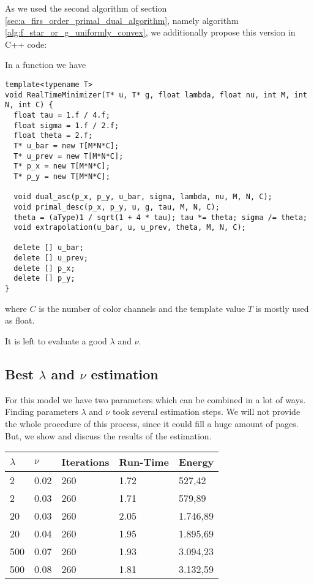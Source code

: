    As we used the second algorithm of section \ref{sec:a_firs_order_primal_dual_algorithm}, namely algorithm \ref{alg:f_star_or_g_uniformly_convex}, we additionally propose this version in C++ code:

    \begin{algorithm}
    \label{alg:primal_dual_2}
        In a function we have
        \begin{lstlisting}
template<typename T>
void RealTimeMinimizer(T* u, T* g, float lambda, float nu, int M, int N, int C) {
  float tau = 1.f / 4.f;
  float sigma = 1.f / 2.f;
  float theta = 2.f;
  T* u_bar = new T[M*N*C];
  T* u_prev = new T[M*N*C];
  T* p_x = new T[M*N*C];
  T* p_y = new T[M*N*C];
  
  void dual_asc(p_x, p_y, u_bar, sigma, lambda, nu, M, N, C);
  void primal_desc(p_x, p_y, u, g, tau, M, N, C);
  theta = (aType)1 / sqrt(1 + 4 * tau); tau *= theta; sigma /= theta;
  void extrapolation(u_bar, u, u_prev, theta, M, N, C);

  delete [] u_bar;
  delete [] u_prev;
  delete [] p_x;
  delete [] p_y;
}
        \end{lstlisting}
        where $C$ is the number of color channels and the template value $T$ is mostly used as float.
    \end{algorithm}

    It is left to evaluate a good $\lambda$ and $\nu$.

    \subsection{Best $\lambda$ and $\nu$ estimation} %
    \label{sub:best_parameter_estimation_rt}
        
        For this model we have two parameters which can be combined in a lot of ways. Finding parameters $\lambda$ and $\nu$ took several estimation steps. We will not provide the whole procedure of this process, since it could fill a huge amount of pages. But, we show and discuss the results of the estimation.

        \begin{center}
            \begin{tabular}{| l | l | l | l | l |}
            \hline
            $\lambda$ & $\nu$ & Iterations & Run-Time & Energy \\ \hline\hline
            2 & 0.02 & 260 & 1.72 & 527,42 \\ \hline
            2 & 0.03 & 260 & 1.71 & 579,89 \\ \hline
            20 & 0.03 & 260 & 2.05 & 1.746,89 \\ \hline
            20 & 0.04 & 260 & 1.95 & 1.895,69 \\ \hline
            500 & 0.07 & 260 & 1.93 & 3.094,23 \\ \hline
            500 & 0.08 & 260 & 1.81 & 3.132,59 \\ \hline
            \end{tabular}
            \label{tab:best_parameters_rt}
        \end{center}


